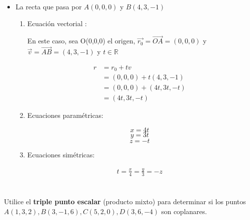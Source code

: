 \documentclass[12pt]{article}
\begin{document}
\begin {itemize}
  
\item La recta que pasa por $A(0,0,0)$ y $B(4,3,-1)$
  
  \begin{enumerate}
    
  \item Ecuación vectorial :
    
    En este caso, sea O(0,0,0) el origen,  $\vec{r_0} = \vec{OA} = (0, 0, 0)$  y  $\vec{v} = \vec{AB}= (4,3,-1)$ y $t \in \mathds{R} $
    
    \begin{equation*}
      \begin{split}
        r &= r_0 + tv \\
        &= (0, 0, 0)  + t(4,3,-1) \\
        &= (0, 0, 0)  + (4t,3t,-t)\\
        &= (4t,3t,-t)
      \end{split}
    \end{equation*}
    
  \item Ecuaciones paramétricas:
    
    $$x = 4t $$
    $$y = 3t$$
    $$z =  -t $$
    
  \item Ecuaciones simétricas:
    
    \begin{equation*}
      \begin{split}
        t = \frac{x}{4} = \frac{y}{3} = -z
      \end{split}
    \end{equation*}
    
  \end{enumerate}
  
\end{itemize}

\section{}

Utilice el \textbf{triple punto escalar} (producto mixto) para determinar si los puntos $A(1,3,2) , B(3,-1,6), C(5,2,0), D(3,6,-4)$ son coplanares.

\end{document}

